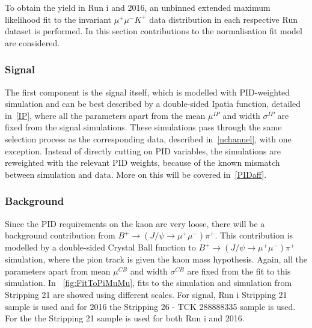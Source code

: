 To obtain the \bjpsimumuk yield in Run \Rn{1} and 2016, an unbinned extended maximum likelihood fit to the invariant $\mu^{+} \mu^{-} K^{+}$ data distribution in each respective Run dataset is performed. In this section contributions to the normalisation fit model are considered. 

\subsubsection{Signal}

	The first component is the signal itself, which is modelled with PID-weighted simulation and can be best described by a double-sided Ipatia function, detailed in~\autoref{IP}, where all the parameters apart from the mean $\mu^{IP}$ and width $\sigma^{IP}$ are fixed from the signal simulations. These simulations pass through the same selection process as the corresponding \bjpsimumuk data, described in~\autoref{nchannel}, with one exception. Instead of directly cutting on \gls{PID} variables, the simulations are reweighted with the relevant \gls{PID} weights, because of the known mismatch between simulation and data. More on this will be covered in~\autoref{PIDaff}. 


\subsubsection{\mb{\bjpsimumupi} Background}

Since the PID requirements on the kaon are very loose, there will be a background contribution from $ B^{+} \rightarrow (J/\psi \rightarrow \mu^{+} \mu^{-}) \pi^{+}$. This contribution is modelled by a double-sided Crystal Ball function to $B^{+} \rightarrow (J/\psi \rightarrow \mu^{+} \mu^{-}) \pi^{+}$ simulation, where the pion track is given the kaon mass hypothesis. Again, all the parameters apart from mean $\mu^{CB}$ and width $\sigma^{CB}$ are fixed from the fit to this simulation. In ~\autoref{fig:FitToPiMuMu}, fits to the \bjpsimumuk simulation and \bjpsimumupi simulation from Stripping 21 are showed using different scales.
For signal, Run \Rn{1} Stripping 21 sample is used and for 2016 the Stripping 26 - TCK 288888335 sample is used. For the \bjpsimumupi the Stripping 21 sample is used for both Run \Rn{1} and 2016.

